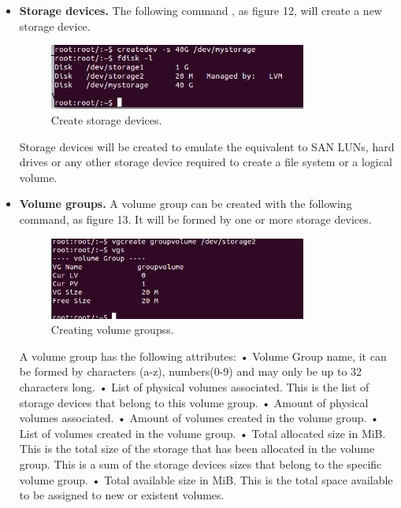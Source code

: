 \documentclass{aes2e}
\begin{document}
\begin{itemize}
\item \textbf{Storage devices.}\newline
The following command , as figure 12, will create a new storage device.\newline
\begin{figure}[ht]
\centering
\includegraphics[width=20pc]{storage.png}
\caption{Create storage devices.}
\end{figure}
Storage devices will be created to emulate the equivalent to SAN LUNs, hard drives or any other storage device required to create a file system or a logical volume. \newline
\item \textbf{Volume groups.}\newline
A volume group can be created with the following command, as figure 13. It will be formed by one or more storage devices.
\begin{figure}[ht]
\centering
\includegraphics[width=20pc]{volumenes.png}
\caption{Creating volume groupss.}
\end{figure}

 A volume group has the following attributes:\newline
• Volume Group name, it can be formed by characters (a-z), numbers(0-9) and may only be up to 32 characters long.\newline
• List of physical volumes associated. This is the list of storage devices that belong to this volume group.\newline
• Amount of physical volumes associated.\newline
• Amount of volumes created in the volume group.\newline
• List of volumes created in the volume group.\newline
• Total allocated size in MiB. This is the total size of the storage that has been allocated in the volume group. This is a sum of the storage devices sizes that belong to the
specific volume group. \newline
• Total available size in MiB. This is the total space available to be assigned to new or existent volumes.\newline


\end{itemize}
\end{document}
